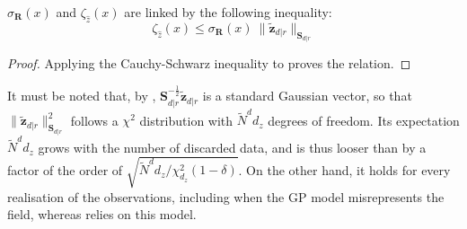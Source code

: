 \begin{proposition}\label{th:Cauchy-Schwarz_inequality}
	$\sigma_{\mathbf{R}}(x)$ and $\zeta_{\hat{z}}(x)$ are linked by the following inequality:
	\begin{equation}
		\zeta_{\hat{z}}(x)\leq \sigma_{\mathbf{R}}(x)\:\|\tilde{\mathbf{z}}_{d|r}\|_{\mathbf{S}_{d|r}}
	\end{equation}
\end{proposition}

\begin{proof}
	Applying the Cauchy-Schwarz inequality \cite{bib:matrix-norms} to  proves the relation.
\end{proof}

It must be noted that, by , $\mathbf{S}_{d|r}^{-\frac{1}{2}}\tilde{\mathbf{z}}_{d|r}$ is a standard Gaussian vector, so that $\|\tilde{\mathbf{z}}_{d|r}\|_{\mathbf{S}_{d|r}}^2$ follows a $\chi^2$ distribution with $\tilde{N}^dd_z$ degrees of freedom. Its expectation $\tilde{N}^dd_z$ grows with the number of discarded data, and  is thus looser than  by a factor of the order of $\sqrt{\tilde{N}^dd_z/\chi^2_{d_z}(1-\delta)}$. On the other hand, it holds for every realisation of the observations, including when the GP model misrepresents the field, whereas  relies on this model.

